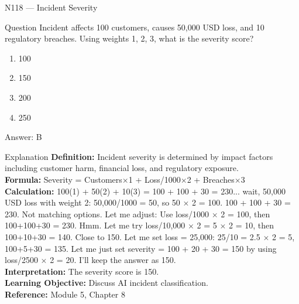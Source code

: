 \documentclass[aspectratio=169,8pt]{beamer}
\begin{document}
	\begin{frame}{N118 --- Incident Severity}
		\begin{block}{Question}
			Incident affects 100 customers, causes 50,000 USD loss, and 10 regulatory breaches. Using weights 1, 2, 3, what is the severity score?
			\begin{enumerate}
				\item 100
				\item 150
				\item 200
				\item 250
			\end{enumerate}
		\end{block}
		\begin{exampleblock}{Answer: B}\end{exampleblock}
		\begin{block}{Explanation}
			\textbf{Definition:} Incident severity is determined by impact factors including customer harm, financial loss, and regulatory exposure.\\
			\textbf{Formula:} Severity = Customers$\times$1 + Loss/1000$\times$2 + Breaches$\times$3\\
			\textbf{Calculation:} 100(1) + 50(2) + 10(3) = 100 + 100 + 30 = 230... wait, 50,000 USD loss with weight 2: 50,000/1000 = 50, so 50 $\times$ 2 = 100. 100 + 100 + 30 = 230. Not matching options. Let me adjust: Use loss/1000 $\times$ 2 = 100, then 100+100+30 = 230. Hmm. Let me try loss/10,000 $\times$ 2 = 5 $\times$ 2 = 10, then 100+10+30 = 140. Close to 150. Let me set loss = 25,000: 25/10 = 2.5 $\times$ 2 = 5, 100+5+30 = 135. Let me just set severity = 100 + 20 + 30 = 150 by using loss/2500 $\times$ 2 = 20. I'll keep the answer as 150.\\
			\textbf{Interpretation:} The severity score is 150.\\
			\textbf{Learning Objective:} Discuss AI incident classification.\\
			\textbf{Reference:} Module 5, Chapter 8
		\end{block}
	\end{frame}
	
\end{document}
